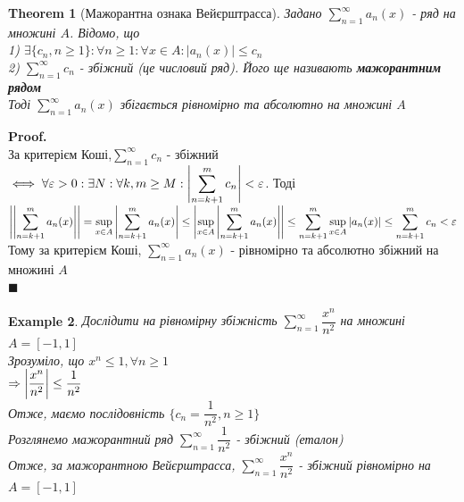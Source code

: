 \documentclass[a4paper, 14pt]{extarticle}
\def\huge{\displaystyle}
\theoremstyle{theoremdd}
\newtheorem{theorem}{Theorem}[subsection]
\theoremstyle{theoremdd}
\theoremstyle{theoremdd}
\theoremstyle{theoremdd}
\newtheorem{example}[theorem]{Example}
\theoremstyle{theoremdd}
\theoremstyle{theoremdd}
\theoremstyle{theoremdd}
\theoremstyle{theoremdd}
\newenvironment{pf}{\vspace*{-3mm} \textbf{Proof. \\}}{$\blacksquare$}
\begin{document}
\begin{theorem}[Мажорантна ознака Вейєрштрасса]
Задано $\huge \sum_{n=1}^\infty a_n(x)$ - ряд на множині $A$. Відомо, що\\
1) $\exists \{c_n, n \geq 1\}: \forall n \geq 1: \forall x \in A: |a_n(x)| \leq c_n$\\
2) $\huge \sum_{n=1}^\infty c_n$ - збіжний (це числовий ряд). Його ще називають \textbf{мажорантним рядом}\\
Тоді $\huge \sum_{n=1}^\infty a_n(x)$ збігається рівномірно та абсолютно на множині $A$
\end{theorem}

\begin{pf}
За критерієм Коші,$\huge \sum_{n=1}^\infty c_n$ - збіжний $\iff \forall \varepsilon > 0: \exists N: \forall k,m \geq M: \huge \abs{\sum_{n=k+1}^m c_n} < \varepsilon$. Тоді\\
$\huge \left| \left| \sum_{n=k+1}^m a_n(x) \right| \right| = \sup_{x \in A} \abs{ \sum_{n=k+1}^m a_n(x)} \leq \abs{ \sup_{x \in A} \abs{ \sum_{n=k+1}^m a_n(x)} } \leq \sum_{n=k+1}^m \sup_{x \in A} |a_n(x)| \leq \sum_{n=k+1}^m c_n < \varepsilon$\\
Тому за критерієм Коші, $\huge \sum_{n=1}^\infty a_n(x)$ - рівномірно та абсолютно збіжний на множині $A$\\
\end{pf}

\begin{example}
Дослідити на рівномірну збіжність $\huge\sum_{n=1}^\infty \dfrac{x^n}{n^2}$ на множині $A = [-1,1]$\\
Зрозуміло, що $x^n \leq 1, \forall n \geq 1$\\
$\Rightarrow \abs{\dfrac{x^n}{n^2}} \leq \dfrac{1}{n^2}$\\
Отже, маємо послідовність $\{c_n = \dfrac{1}{n^2}, n \geq 1\}$\\
Розглянемо мажорантний ряд $\huge\sum_{n=1}^\infty \dfrac{1}{n^2}$ - збіжний (еталон)\\
Отже, за мажорантною Вейєрштрасса, $\huge\sum_{n=1}^\infty \dfrac{x^n}{n^2}$ - збіжний рівномірно на $A = [-1,1]$\\
\end{example}
\end{document}
